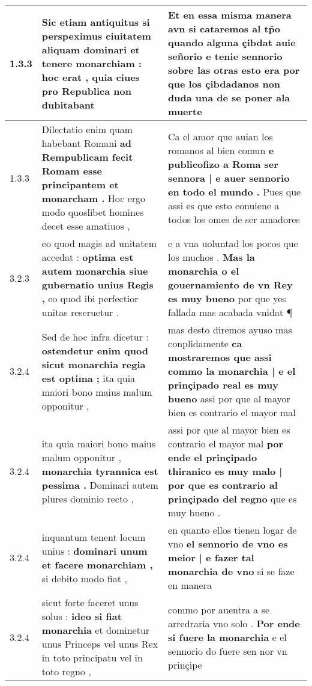 \begin{tabular}{|p{1cm}|p{6.5cm}|p{6.5cm}|}

\hline
1.3.3 & Sic etiam antiquitus \textbf{ si perspeximus ciuitatem aliquam dominari et tenere monarchiam : } hoc erat , quia ciues pro Republica non dubitabant & Et en essa misma manera avn si cataremos al tp̃o \textbf{ quando alguna çibdat auie señorio e tenie sennorio sobre las otras esto era } por que los çibdadanos non duda una de se poner ala muerte \\\hline
1.3.3 & Dilectatio enim quam habebant Romani \textbf{ ad Rempublicam fecit Romam esse principantem et monarcham . } Hoc ergo modo quoslibet homines decet esse amatiuos , & Ca el amor que auian los romanos al bien comun \textbf{ e publicofizo a Roma ser sennora | e auer sennorio en todo el mundo . } Pues que assi es que esto conuiene a todos los omes de ser amadores \\\hline
3.2.3 & eo quod magis ad unitatem accedat : \textbf{ optima est autem monarchia siue gubernatio unius Regis , } eo quod ibi perfectior unitas reseruetur . & e a vna uoluntad los pocos que los muchos . \textbf{ Mas la monarchia o el gouernamiento de vn Rey es muy bueno } por que yes fallada mas acabada vnidat ¶ \\\hline
3.2.4 & Sed de hoc infra dicetur : \textbf{ ostendetur enim quod sicut monarchia regia est optima ; } ita quia maiori bono maius malum opponitur , & mas desto diremos ayuso mas conplidamente \textbf{ ca mostraremos que assi commo la monarchia | e el prinçipado real es muy bueno } assi por que al mayor bien es contrario el mayor mal \\\hline
3.2.4 & ita quia maiori bono maius malum opponitur , \textbf{ monarchia tyrannica est pessima . } Dominari autem plures dominio recto , & assi por que al mayor bien es contrario el mayor mal \textbf{ por ende el prinçipado thiranico es muy malo | por que es contrario al prinçipado del regno } que es muy bueno . \\\hline
3.2.4 & inquantum tenent locum unius : \textbf{ dominari unum et facere monarchiam , } si debito modo fiat , & en quanto ellos tienen logar de vno \textbf{ el sennorio de vno es meior | e fazer tal monarchia de vno } si se faze en manera \\\hline
3.2.4 & sicut forte faceret unus solus : \textbf{ ideo si fiat monarchia } et dominetur unus Princeps vel unus Rex in toto principatu vel in toto regno , & commo por auentra a se arredraria vno solo . \textbf{ Por ende si fuere la monarchia } e el sennorio do fuere sen nor vn prinçipe \\\hline

\end{tabular}
